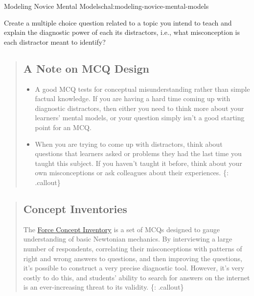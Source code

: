 \begin{challenge}{Modeling Novice Mental Models}{chal:modeling-novice-mental-models}

Create a multiple choice question related to a topic you intend to teach
and explain the diagnostic power of each its distractors, i.e., what
misconception is each distractor meant to identify?
\end{challenge}

\begin{quote}
\subsection{A Note on MCQ Design}\label{a-note-on-mcq-design}

\begin{itemize}
\item
  A good MCQ tests for conceptual misunderstanding rather than simple
  factual knowledge. If you are having a hard time coming up with
  diagnostic distractors, then either you need to think more about your
  learners' mental models, or your question simply isn't a good starting
  point for an MCQ.
\item
  When you are trying to come up with distractors, think about questions
  that learners asked or problems they had the last time you taught this
  subject. If you haven't taught it before, think about your own
  misconceptions or ask colleagues about their experiences. \{:
  .callout\}
\end{itemize}
\end{quote}

\begin{quote}
\subsection{Concept Inventories}\label{concept-inventories}

The \href{https://en.wikipedia.org/wiki/Force\_Concept\_Inventory}{Force
Concept Inventory} is a set of MCQs designed to gauge understanding of
basic Newtonian mechanics. By interviewing a large number of
respondents, correlating their misconceptions with patterns of right and
wrong answers to questions, and then improving the questions, it's
possible to construct a very precise diagnostic tool. However, it's very
costly to do this, and students' ability to search for answers on the
internet is an ever-increasing threat to its validity. \{: .callout\}
\end{quote}

